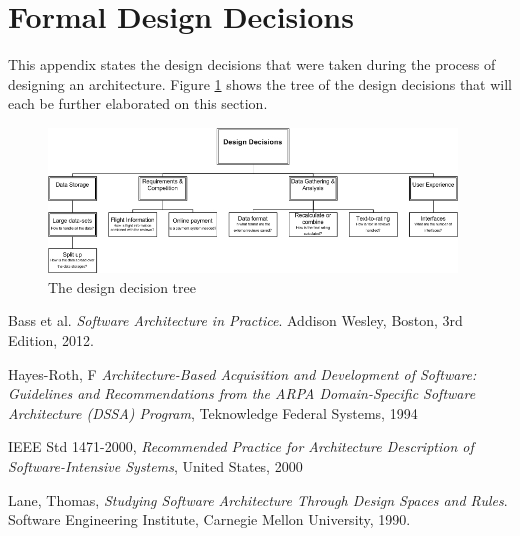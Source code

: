 \documentclass{article}
\begin{document}
\section{Formal Design Decisions}

This appendix states the design decisions that were taken during the process of designing an architecture. Figure \ref{fig:ddtree} shows the tree of the design decisions that will each be further elaborated on this section. 

\begin{figure}[!ht]
\includegraphics[width= 410px]{DDTree}
\caption{The design decision tree}
\label{fig:ddtree}
\end{figure}

\newpage


\newpage

\newpage

\newpage

\newpage

\newpage

\newpage




\begin{thebibliography}{9}

Bass et al.
  \emph{Software Architecture in Practice}.
  Addison Wesley, Boston,
  3rd Edition,
  2012.

 Hayes-Roth, F
 \emph{Architecture-Based Acquisition and Development of Software: Guidelines and Recommendations from the ARPA Domain-Speciﬁc
 Software Architecture (DSSA) Program},
 Teknowledge Federal Systems,
 1994

 IEEE Std 1471-2000,
 \emph{Recommended Practice for Architecture Description of Software-Intensive Systems},
 United States,
 2000

  Lane, Thomas,
  \emph{Studying Software Architecture Through Design Spaces and Rules}.
  Software Engineering Institute, Carnegie Mellon University,
  1990.

\end{thebibliography}
\end{document}
